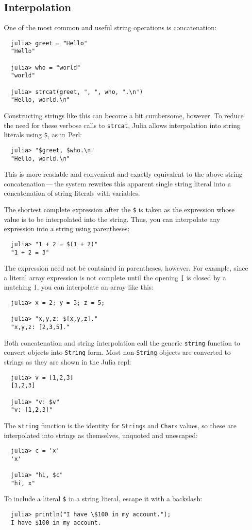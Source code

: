 \documentclass{article}
\begin{document}
\subsection{Interpolation}

One of the most common and useful string operations is concatenation:
\begin{verbatim}
  julia> greet = "Hello"
  "Hello"

  julia> who = "world"
  "world"

  julia> strcat(greet, ", ", who, ".\n")
  "Hello, world.\n"
\end{verbatim}
Constructing strings like this can become a bit cumbersome, however.
To reduce the need for these verbose calls to \verb|strcat|, Julia allows interpolation into string literals using \verb|$|, as in Perl:
\begin{verbatim}
  julia> "$greet, $who.\n"
  "Hello, world.\n"
\end{verbatim}
This is more readable and convenient and exactly equivalent to the above string concatenation\,---\,the system rewrites this apparent single string literal into a concatenation of string literals with variables.

The shortest complete expression after the \verb|$| is taken as the expression whose value is to be interpolated into the string.
Thus, you can interpolate any expression into a string using parentheses:
\begin{verbatim}
  julia> "1 + 2 = $(1 + 2)"
  "1 + 2 = 3"
\end{verbatim}
The expression need not be contained in parentheses, however.
For example, since a literal array expression is not complete until the opening \verb|[| is closed by a matching \verb|]|, you can interpolate an array like this:
\begin{verbatim}
  julia> x = 2; y = 3; z = 5;

  julia> "x,y,z: $[x,y,z]."
  "x,y,z: [2,3,5]."
\end{verbatim}
Both concatenation and string interpolation call the generic \verb|string| function to convert objects into \verb|String| form.
Most non-\verb|String| objects are converted to strings as they are shown in the Julia repl:
\begin{verbatim}
  julia> v = [1,2,3]
  [1,2,3]

  julia> "v: $v"
  "v: [1,2,3]"
\end{verbatim}
The \verb|string| function is the identity for \verb|String|s and \verb|Char|s values, so these are interpolated into strings as themselves, unquoted and unescaped:
\begin{verbatim}
  julia> c = 'x'
  'x'

  julia> "hi, $c"
  "hi, x"
\end{verbatim}
To include a literal \verb|$| in a string literal, escape it with a backslash:
\begin{verbatim}
  julia> println("I have \$100 in my account.");
  I have $100 in my account.
\end{verbatim}
\end{document}
